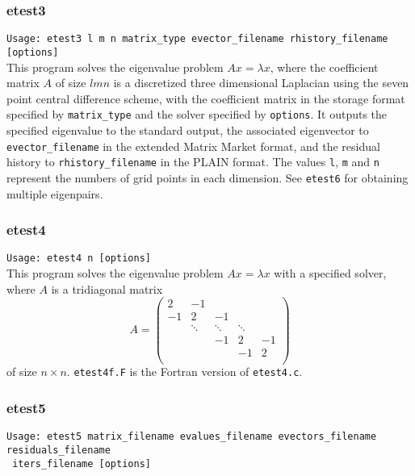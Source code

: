 \documentclass[a4paper]{article}
\begin{document}
\subsubsection{etest3}

\verb+Usage: etest3 l m n matrix_type evector_filename rhistory_filename [options]+\\

This program solves the eigenvalue problem $Ax = \lambda x$, where the 
coefficient matrix $A$ of size $lmn$ is a discretized three dimensional Laplacian using the seven
point central difference scheme, with the coefficient matrix in the storage format specified
by \verb|matrix_type| and the solver specified by {\tt options}. 
It outputs the specified eigenvalue to the standard output, 
the associated eigenvector to {\tt evector\_filename} in the
extended Matrix Market format, and
the residual history to {\tt rhistory\_filename} 
in the PLAIN format. 
The values {\tt l}, {\tt m} and {\tt n} represent the numbers of grid
points in each dimension. 
See {\tt etest6} for obtaining multiple eigenpairs.

\subsubsection{etest4}

\verb+Usage: etest4 n [options]+\\

This program solves the eigenvalue problem $Ax = \lambda x$ with a specified 
solver, where $A$ is a tridiagonal matrix
\[
A = 
\left(
\begin{array}{ccccc}
2 & -1 &   &  &   \\
-1 & 2 & -1 &  &   \\
  & \ddots  & \ddots  & \ddots  &   \\
  &   & -1 & 2 & -1 \\
  &   &   & -1 & 2 \\
\end{array}
\right)
\]
of size $n \times n$.
{\tt etest4f.F} is the Fortran version of {\tt etest4.c}.

\subsubsection{etest5}

\verb+Usage: etest5 matrix_filename evalues_filename evectors_filename residuals_filename +\\
\verb+ iters_filename [options] +\\
\end{document}
